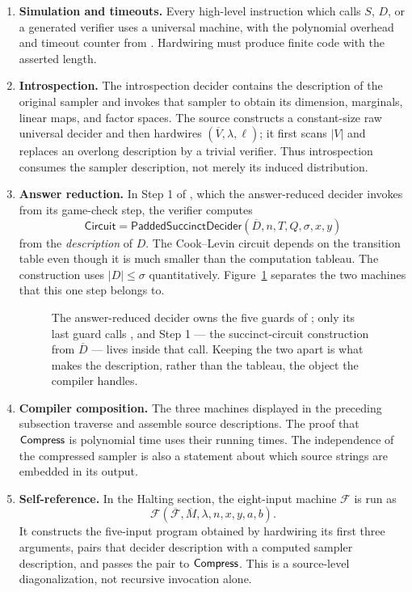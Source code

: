 \begin{enumerate}
\item \textbf{Simulation and timeouts.}  Every high-level instruction which
calls \(S\), \(D\), or a generated verifier uses a universal machine, with the
polynomial overhead and timeout counter from .  Hardwiring must
produce finite code with the asserted length.

\item \textbf{Introspection.}  The introspection decider contains the
description of the original sampler and invokes that sampler to obtain its
dimension, marginals, linear maps, and factor spaces.  The source constructs a
constant-size raw universal decider and then hardwires
\((\overline V,\lambda,\ell)\); it first scans \(|V|\) and replaces an
overlong description by a trivial verifier.  Thus introspection consumes the
sampler description, not merely its induced distribution.

\item \textbf{Answer reduction.}  In Step 1 of , which
the answer-reduced decider invokes from its game-check step, the verifier
computes
\[
 \mathsf{Circuit}=\mathsf{PaddedSuccinctDecider}
   (\overline D,n,T,Q,\sigma,x,y)
\]
from the \emph{description} of \(D\).  The Cook--Levin circuit depends on the
transition table even though it is much smaller than the computation tableau.
The construction uses \(|D|\leq\sigma\) quantitatively.
Figure~\ref{fig:ar-invokes-pcp} separates the two machines that this one step
belongs to.
\begin{figure}[H]
\centering

\caption{The answer-reduced decider owns the five guards of ; only its last guard calls , and Step 1 --- the succinct-circuit construction from \(\overline D\) --- lives inside that call.  Keeping the two apart is what makes the description, rather than the tableau, the object the compiler handles.}
\label{fig:ar-invokes-pcp}
\end{figure}

\item \textbf{Compiler composition.}  The three machines displayed in the
preceding subsection traverse and assemble source descriptions.  The proof
that \(\mathsf{Compress}\) is polynomial time uses their running times.  The
independence of the compressed sampler is also a statement about which source
strings are embedded in its output.

\item \textbf{Self-reference.}  In the Halting section, the eight-input
machine \(\mathcal F\) is run as
\[
 \mathcal F(\overline{\mathcal F},\overline M,
             \lambda,n,x,y,a,b).
\]
It constructs the five-input program obtained by hardwiring its first three
arguments, pairs that decider description with a computed sampler description,
and passes the pair to \(\mathsf{Compress}\).  This is a source-level diagonalization,
not recursive invocation alone.
\end{enumerate}

